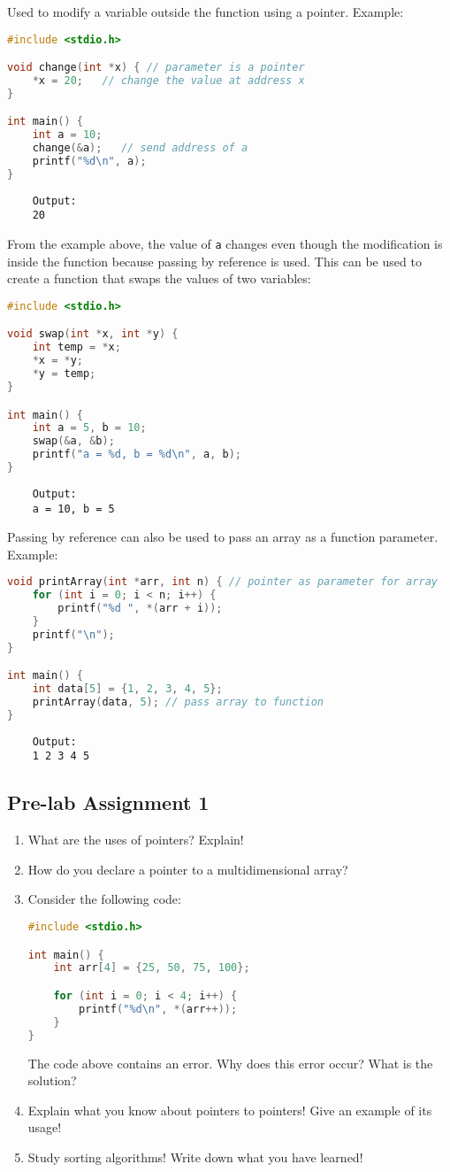 Used to modify a variable outside the function using a pointer.
Example:
\begin{lstlisting}[language=c]
#include <stdio.h>

void change(int *x) { // parameter is a pointer
	*x = 20;   // change the value at address x
}

int main() {
	int a = 10;
	change(&a);   // send address of a
	printf("%d\n", a);
}
\end{lstlisting}
\begin{verbatim}
	Output:
	20
\end{verbatim}
From the example above, the value of \texttt{a} changes even though the modification is inside the function because passing by reference is used.
This can be used to create a function that swaps the values of two variables:
\begin{lstlisting}[language=c]
#include <stdio.h>

void swap(int *x, int *y) {
	int temp = *x;
	*x = *y;
	*y = temp;
}

int main() {
	int a = 5, b = 10;
	swap(&a, &b);
	printf("a = %d, b = %d\n", a, b);
}
\end{lstlisting}
\begin{verbatim}
	Output:
	a = 10, b = 5
\end{verbatim}
Passing by reference can also be used to pass an array as a function parameter.
Example:
\begin{lstlisting}[language=c]
void printArray(int *arr, int n) { // pointer as parameter for array
	for (int i = 0; i < n; i++) {
		printf("%d ", *(arr + i));
	}
	printf("\n");
}

int main() {
	int data[5] = {1, 2, 3, 4, 5};
	printArray(data, 5); // pass array to function
}
\end{lstlisting}
\begin{verbatim}
    Output:
    1 2 3 4 5     
\end{verbatim}

\subsection*{Pre-lab Assignment 1}
\begin{enumerate}
    \item What are the uses of pointers? Explain!
    \item How do you declare a pointer to a multidimensional array?
    \item Consider the following code:
    \begin{lstlisting}[language=c]
#include <stdio.h>

int main() {
	int arr[4] = {25, 50, 75, 100};

	for (int i = 0; i < 4; i++) {
		printf("%d\n", *(arr++));
	}
}
\end{lstlisting}
    The code above contains an error. Why does this error occur? What is the solution?
    \item Explain what you know about pointers to pointers! Give an example of its usage!
    \item Study sorting algorithms! Write down what you have learned!
\end{enumerate}

